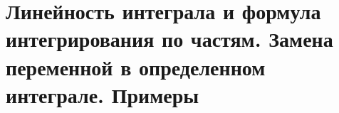 \section{Линейность интеграла и формула интегрирования по частям. Замена переменной в определенном интеграле. Примеры}
